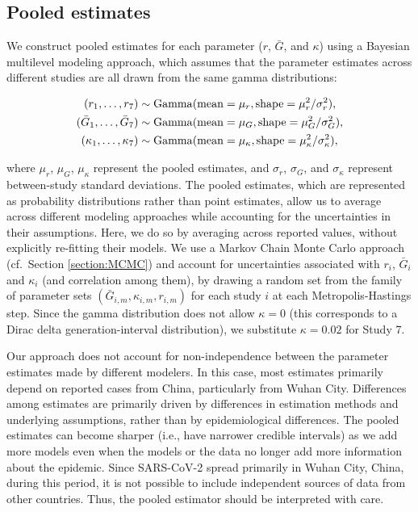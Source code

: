 \documentclass[12pt]{article}
\begin{document}
\subsection{Pooled estimates}

We construct pooled estimates for each parameter ($r$, $\bar G$, and $\kappa$) using a Bayesian multilevel modeling approach, which assumes that the parameter estimates across different studies are all drawn from the same gamma distributions:
\begin{linenomath*}
\begin{equation}
\begin{aligned}
(r_1, \dots, r_7) &\sim \mathrm{Gamma}(\mathrm{mean}=\mu_r, \mathrm{shape}=\mu_r^2/\sigma_r^2),\\
(\bar{G}_1, \dots, \bar{G}_7) &\sim \mathrm{Gamma}(\mathrm{mean}=\mu_G, \mathrm{shape}=\mu_G^2/\sigma_G^2),\\
(\kappa_1, \dots, \kappa_7) &\sim \mathrm{Gamma}(\mathrm{mean}=\mu_\kappa, \mathrm{shape}=\mu_\kappa^2/\sigma_\kappa^2),\\
\end{aligned}
\end{equation}
\end{linenomath*}
where $\mu_r$, $\mu_G$, $\mu_\kappa$ represent the pooled estimates, and $\sigma_r$, $\sigma_G$, and $\sigma_\kappa$ represent between-study standard deviations.
The pooled estimates, which are represented as probability distributions rather than point estimates, allow us to average across different modeling approaches while accounting for the uncertainties in their assumptions.
Here, we do so by averaging across reported values, without explicitly re-fitting their models.
We use a Markov Chain Monte Carlo approach (cf.~Section \ref{section:MCMC}) and account for uncertainties associated with $r_i$, $\bar G_i$ and $\kappa_i$ (and correlation among them), by drawing a random set from the family of parameter sets $(\bar{G}_{i,m}, \kappa_{i,m}, r_{i,m})$ for each study $i$ at each Metropolis-Hastings step.
Since the gamma distribution does not allow $\kappa=0$ (this corresponds to a Dirac delta generation-interval distribution), we substitute $\kappa=0.02$ for Study 7.

Our approach does not account for non-independence between the parameter estimates made by different modelers.
In this case, most estimates primarily depend on reported cases from China, particularly from Wuhan City.
Differences among estimates are primarily driven by differences in estimation methods and underlying assumptions, rather than by epidemiological differences.
The pooled estimates can become sharper (i.e., have narrower credible intervals) as we add more models even when the models or the data no longer add more information about the epidemic.
Since SARS-CoV-2 spread primarily in Wuhan City, China, during this period, it is not possible to include independent sources of data from other countries.
Thus, the pooled estimator should be interpreted with care.
\end{document}
